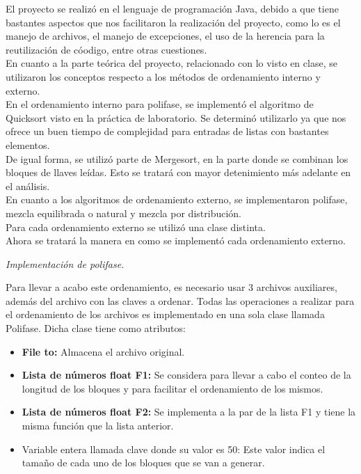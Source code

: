 \documentclass[12pt,letterpaper]{article}
\begin{document}
\begin{large}
El proyecto se realizó en el lenguaje de programación Java, debido a que tiene bastantes aspectos que nos facilitaron la realización del proyecto, como lo es el manejo de archivos, el manejo de excepciones, el uso de la herencia para la reutilización de cóodigo, entre otras cuestiones.\\
En cuanto a la parte teórica del proyecto, relacionado con lo visto en clase, se utilizaron los conceptos respecto a los métodos de ordenamiento interno y externo.\\
En el ordenamiento interno para polifase, se implementó el algoritmo de Quicksort visto en la práctica de laboratorio. Se determinó utilizarlo ya que nos ofrece un buen tiempo de complejidad para entradas de listas con bastantes elementos.\\
De igual forma, se utilizó parte de Mergesort, en la parte donde se combinan los bloques de llaves leídas. Esto se tratará con mayor detenimiento más adelante en el análisis.\\
En cuanto a los algoritmos de ordenamiento externo, se implementaron polifase, mezcla equilibrada o natural y mezcla por distribución.\\
Para cada ordenamiento externo se utilizó una clase distinta.\\
Ahora se tratará la manera en como se implementó cada ordenamiento externo.\par
\vspace{0.2cm}
\noindent\textit{Implementación de polifase.}\par
Para llevar a acabo este ordenamiento, es necesario usar 3 archivos auxiliares, además del archivo con las claves a ordenar. Todas las operaciones a realizar para el ordenamiento de los archivos es implementado en una sola clase llamada Polifase. Dicha clase tiene como atributos: 
\begin{itemize}[noitemsep,topsep=0pt]
\item\textbf{File to:} Almacena el archivo original.
\item\textbf{Lista de números float F1:} Se considera para llevar a cabo el conteo de la longitud de los bloques y para facilitar el ordenamiento de los mismos.
\item\textbf{Lista de números float F2:} Se implementa a la par de la lista F1 y tiene la misma función que la lista anterior.
\item Variable entera llamada clave donde su valor es 50: Este valor indica el tamaño de cada uno de los bloques que se van a generar.

\end{itemize}
\end{large}
\end{document}
